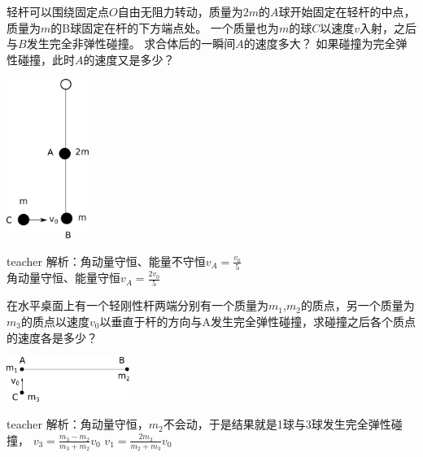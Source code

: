 \begin{example}
轻杆可以围绕固定点$O$自由无阻力转动，质量为$2m$的$A$球开始固定在轻杆的中点，质量为$m$的B球固定在杆的下方端点处。
一个质量也为$m$的球$C$以速度$v$入射，之后与$B$发生完全非弹性碰撞。
求合体后的一瞬间$A$的速度多大？
如果碰撞为完全弹性碰撞，此时$A$的速度又是多少？
	\begin{flushright}
		\includegraphics[width = 0.2\textwidth]{images/ang-momontum-3.pdf} 
	\end{flushright}
\begin{taggedblock}{teacher}
\noindent
解析：角动量守恒、能量不守恒$v_A=\frac{v_0}{5}$
\\
角动量守恒、能量守恒$v_A=\frac{2v_0}{5}$
\end{taggedblock}
\end{example}




\begin{example}
在水平桌面上有一个轻刚性杆两端分别有一个质量为$m_{1}$,$m_2$的质点，另一个质量为$m_3$的质点以速度$v_0$以垂直于杆的方向与A发生完全弹性碰撞，求碰撞之后各个质点的速度各是多少？
	\begin{flushright}
		\includegraphics[width = 0.3\textwidth]{images/ang-momontum-2.pdf} 
	\end{flushright}
\begin{taggedblock}{teacher}
\noindent
解析：角动量守恒，$m_2$不会动，于是结果就是1球与3球发生完全弹性碰撞，
$v_3=\frac{m_3-m_2}{m_3+m_2}v_0$   $v_1=\frac{2m_3}{m_2+m_3}v_0$  
\end{taggedblock}
\end{example}



